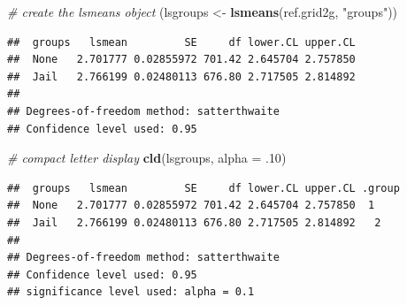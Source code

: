 \documentclass[ignorenonframetext,]{beamer}
\newenvironment{Shaded}{\begin{snugshade}}{\end{snugshade}}
\newcommand{\KeywordTok}[1]{\textcolor[rgb]{0.13,0.29,0.53}{\textbf{{#1}}}}
\newcommand{\DataTypeTok}[1]{\textcolor[rgb]{0.13,0.29,0.53}{{#1}}}
\newcommand{\DecValTok}[1]{\textcolor[rgb]{0.00,0.00,0.81}{{#1}}}
\newcommand{\StringTok}[1]{\textcolor[rgb]{0.31,0.60,0.02}{{#1}}}
\newcommand{\CommentTok}[1]{\textcolor[rgb]{0.56,0.35,0.01}{\textit{{#1}}}}
\newcommand{\NormalTok}[1]{{#1}}
\begin{document}
\begin{frame}[fragile]

\begin{Shaded}
\begin{Highlighting}[]
\CommentTok{# create the lsmeans object}
\NormalTok{(lsgroups   <-}\StringTok{ }\KeywordTok{lsmeans}\NormalTok{(ref.grid2g, }\StringTok{"groups"}\NormalTok{))}
\end{Highlighting}
\end{Shaded}

\begin{verbatim}
##  groups   lsmean         SE     df lower.CL upper.CL
##  None   2.701777 0.02855972 701.42 2.645704 2.757850
##  Jail   2.766199 0.02480113 676.80 2.717505 2.814892
## 
## Degrees-of-freedom method: satterthwaite 
## Confidence level used: 0.95
\end{verbatim}

\end{frame}

\begin{frame}[fragile]

\begin{Shaded}
\begin{Highlighting}[]
\CommentTok{# compact letter display}
\KeywordTok{cld}\NormalTok{(lsgroups, }\DataTypeTok{alpha =} \NormalTok{.}\DecValTok{10}\NormalTok{)}
\end{Highlighting}
\end{Shaded}

\begin{verbatim}
##  groups   lsmean         SE     df lower.CL upper.CL .group
##  None   2.701777 0.02855972 701.42 2.645704 2.757850  1    
##  Jail   2.766199 0.02480113 676.80 2.717505 2.814892   2   
## 
## Degrees-of-freedom method: satterthwaite 
## Confidence level used: 0.95 
## significance level used: alpha = 0.1
\end{verbatim}

\end{frame}
\end{document}

